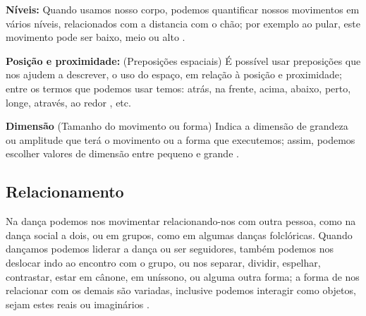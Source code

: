 \textbf{Níveis:} Quando usamos nosso corpo, 
podemos quantificar nossos movimentos em vários níveis,
relacionados com a distancia com o chão;
por exemplo ao pular, este movimento pode ser baixo, meio ou alto 
\cite[pp. 8]{carline2011lesson}
\cite[pp. 32]{paine2014complete}
\cite[pp. 96]{schrader2005sense}.

\textbf{Posição e proximidade:}  (Preposições espaciais)
É possível usar preposições que nos ajudem a descrever, o uso do espaço,
em relação à posição e proximidade; entre os termos que podemos usar temos:
atrás, na frente, 
acima, abaixo, 
perto, longe, 
através, ao redor
\cite[pp. 32]{paine2014complete} 
\cite[pp. 9]{carline2011lesson}, etc.

\textbf{Dimensão} (Tamanho do movimento ou forma) 
Indica a dimensão de grandeza ou amplitude que terá o movimento ou a forma que executemos;
assim, podemos escolher valores de dimensão entre pequeno e grande 
\cite[pp. 32]{paine2014complete} 
\cite[pp. 99]{schrader2005sense}.



\subsection{Relacionamento} 
Na dança podemos nos movimentar relacionando-nos com outra pessoa, como na dança social a  dois,
ou em grupos, como em algumas danças folclóricas.
Quando dançamos podemos liderar a dança ou ser seguidores, 
também podemos nos deslocar indo ao encontro com o grupo, 
ou nos separar, dividir, espelhar, contrastar, 
estar em cânone, em uníssono, ou alguma outra forma;
a forma de nos relacionar com os demais são variadas,
inclusive podemos interagir como objetos, sejam estes reais ou imaginários
 \cite[pp. 9]{carline2011lesson}
 \cite[pp. 27, 32-33]{paine2014complete}
\cite[pp. 131, 132, 134]{mccutchen2006teaching}.


